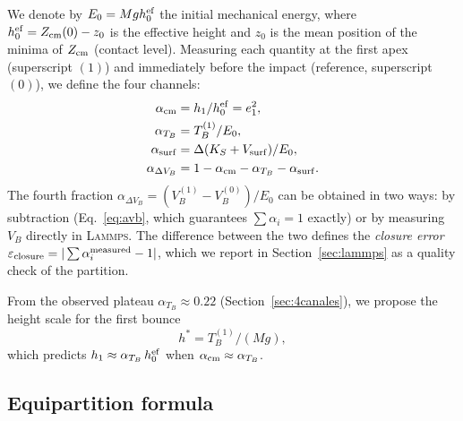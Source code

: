 \documentclass[aps,pre,twocolumn,reprint,superscriptaddress]{revtex4-2}
\newcommand{\lammps}{\textsc{Lammps}}
\begin{document}
We denote by $E_0 = Mg h_0^{\rm ef}$ the initial mechanical energy, where
$h_0^{\rm ef}=Z_{\rm cm}(0)-z_0$ is the effective height and $z_0$ is the
mean position of the minima of $Z_{\rm cm}$ (contact level). Measuring each
quantity at the first apex (superscript $(1)$) and immediately before the
impact (reference, superscript $(0)$), we define the four channels:
\begin{align}
    \alpha_{\rm cm}         &= h_1/h_0^{\rm ef} = e_1^2, \label{eq:acm}\\
    \alpha_{T_B}            &= T_B^{(1)}/E_0,   \label{eq:atb}\\
    \alpha_{\rm surf}       &= \Delta(K_S + V_{\rm surf})/E_0, \label{eq:asurf}\\
    \alpha_{\Delta V_B}     &= 1-\alpha_{\rm cm}-\alpha_{T_B}-\alpha_{\rm surf}.
    \label{eq:avb}
\end{align}
The fourth fraction $\alpha_{\Delta V_B}=(V_B^{(1)}-V_B^{(0)})/E_0$ can be
obtained in two ways: by subtraction (Eq.~\eqref{eq:avb}, which guarantees
$\sum\alpha_i=1$ exactly) or by measuring $V_B$ directly in \lammps{}.
The difference between the two defines the \emph{closure error}
$\varepsilon_{\rm closure}=|\sum\alpha_i^{\rm measured}-1|$, which we report
in Section~\ref{sec:lammps} as a quality check of the partition.

From the observed plateau $\alpha_{T_B}\approx0.22$
(Section~\ref{sec:4canales}), we propose the height scale for the first
bounce
\begin{equation}
    h^* = T_B^{(1)}/(Mg),
    \label{eq:hstar}
\end{equation}
which predicts $h_1\approx\alpha_{T_B}\,h_0^{\rm ef}$ when
$\alpha_{\rm cm}\approx\alpha_{T_B}$.

\subsection{Equipartition formula}
\label{sec:equiparticion}
\end{document}
